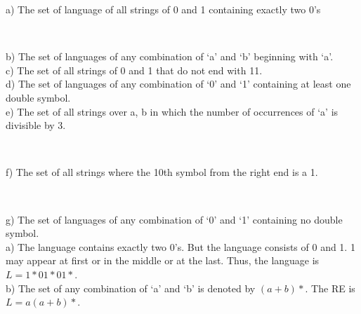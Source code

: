 \documentclass[8pt]{beamer}
\begin{document}
\begin{frame}
a) The set of language of all strings of 0 and 1 containing exactly two 0’s\\
\begin{flushright}
   [UPTU 2004]\\
\end{flushright}
b) The set of languages of any combination of ‘a’ and ‘b’ beginning with ‘a’.\\
c) The set of all strings of 0 and 1 that do not end with 11.\\
d) The set of languages of any combination of ‘0’ and ‘1’ containing at least one double symbol.\\
e) The set of all strings over {a, b} in which the number of occurrences of ‘a’ is divisible by 3.\\
\begin{flushright}
  [UPTU 2004]\\
\end{flushright}

f) The set of all strings where the 10th symbol from the right end is a 1.\\
\begin{flushright}
   [JNTU 2007]\\
\end{flushright}
g) The set of languages of any combination of ‘0’ and ‘1’ containing no double symbol.\\
a) The language contains exactly two 0’s. But the language consists of 0 and 1. 1 may appear at
first or in the middle or at the last. Thus, the language is $L = 1*01*01*$.\\
b) The set of any combination of ‘a’ and ‘b’ is denoted by $(a+b)*$. The RE is\\

\vspace*{0.3cm}
\hspace*{4cm} $L = a(a+b)*$. \\

\vspace*{0.3cm}
\end{frame}
\end{document}
